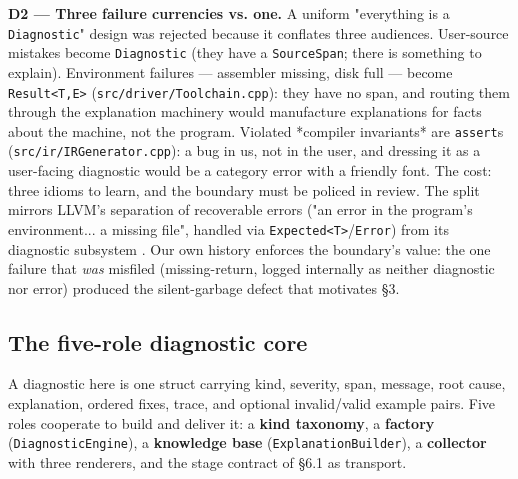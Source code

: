 \textbf{D2 --- Three failure currencies vs. one.} A uniform "everything is
a \texttt{Diagnostic}" design was rejected because it conflates three
audiences. User-source mistakes become \texttt{Diagnostic} (they have a
\texttt{SourceSpan}; there is something to explain). Environment failures ---
assembler missing, disk full --- become \texttt{Result<T,E>}
(\texttt{src/driver/Toolchain.cpp}): they have no span, and routing them
through the explanation machinery would manufacture explanations for
facts about the machine, not the program. Violated *compiler
invariants* are \texttt{assert}s (\texttt{src/ir/IRGenerator.cpp}): a bug in us,
not in the user, and dressing it as a user-facing diagnostic would be
a category error with a friendly font. The cost: three idioms to
learn, and the boundary must be policed in review. The split mirrors
LLVM's separation of recoverable errors ("an error in the program's
environment... a missing file", handled via \texttt{Expected<T>}/\texttt{Error})
from its diagnostic subsystem \cite{llvm-programmers-manual}. Our own history enforces the boundary's
value: the one failure that \emph{was} misfiled (missing-return, logged
internally as neither diagnostic nor error) produced the
silent-garbage defect that motivates \S3.

\subsection{The five-role diagnostic core}

A diagnostic here is one struct carrying kind, severity, span,
message, root cause, explanation, ordered fixes, trace, and optional
invalid/valid example pairs. Five roles cooperate to build and
deliver it: a \textbf{kind taxonomy}, a \textbf{factory} (\texttt{DiagnosticEngine}),
a \textbf{knowledge base} (\texttt{ExplanationBuilder}), a \textbf{collector} with
three renderers, and the stage contract of \S6.1 as transport.

